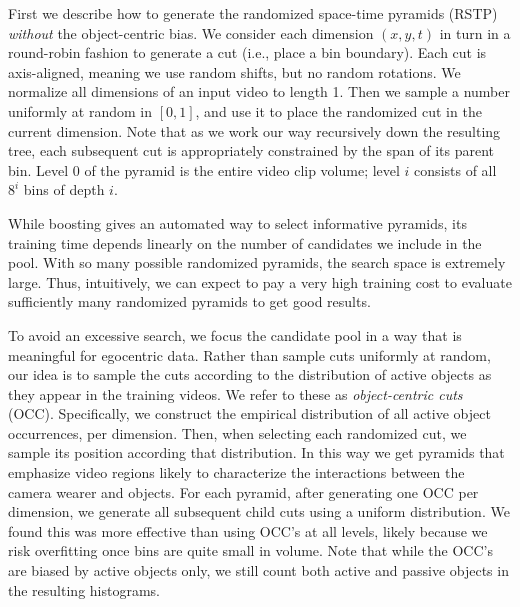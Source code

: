 First we describe how to generate the randomized space-time pyramids (RSTP) \emph{without} the object-centric bias.  We consider each dimension $(x,y,t)$ in turn in a round-robin fashion to generate a cut (i.e., place a bin boundary).  Each cut is axis-aligned, meaning we use random shifts, but no random rotations.  We normalize all dimensions of an input video to length 1.  Then we sample a number uniformly at random in $[0,1]$, and use it to place the randomized cut in the current dimension.  Note that as we work our way recursively down the resulting tree, each subsequent cut is appropriately constrained by the span of its parent bin.  Level 0 of the pyramid is the entire video clip volume; level $i$ consists of all $8^i$ bins of depth $i$.

While boosting gives an automated way to select informative pyramids, its training time depends linearly on the number of candidates we include in the pool.  With so many possible randomized pyramids, the search space is extremely large.  Thus, intuitively, we can expect to pay a very high training cost to evaluate sufficiently many randomized pyramids to get good results.  

To avoid an excessive search, we focus the candidate pool in a way that is meaningful for egocentric data.  Rather than sample cuts uniformly at random, our idea is to sample the cuts according to the distribution of active objects as they appear in the training videos.  We refer to these as \emph{object-centric cuts} (OCC).  Specifically, we construct the empirical distribution of all active object occurrences, per dimension.  Then, when selecting each randomized cut, we sample its position according that distribution.  In this way we get pyramids that emphasize video regions likely to characterize the interactions between the camera wearer and objects.  For each pyramid, after generating one OCC per dimension, we generate all subsequent child cuts using a uniform distribution.  We found this was more effective than using OCC's at all levels, likely because we risk overfitting once bins are quite small in volume.  Note that while the OCC's are biased by active objects only, we still count both active and passive objects in the resulting histograms.



